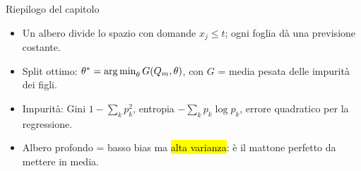 \begin{appunti}{Riepilogo del capitolo}
\begin{itemize}
  \item Un albero divide lo spazio con domande $x_j\le t$; ogni foglia dà una previsione costante.
  \item Split ottimo: $\theta^*=\operatorname*{arg\,min}_\theta G(Q_m,\theta)$, con $G$ = media pesata delle impurità dei figli.
  \item Impurità: Gini $1-\sum_k p_k^2$, entropia $-\sum_k p_k\log p_k$, errore quadratico per la regressione.
  \item Albero profondo = basso bias ma \hl{alta varianza}: è il mattone perfetto da mettere in media.
\end{itemize}
\end{appunti}
